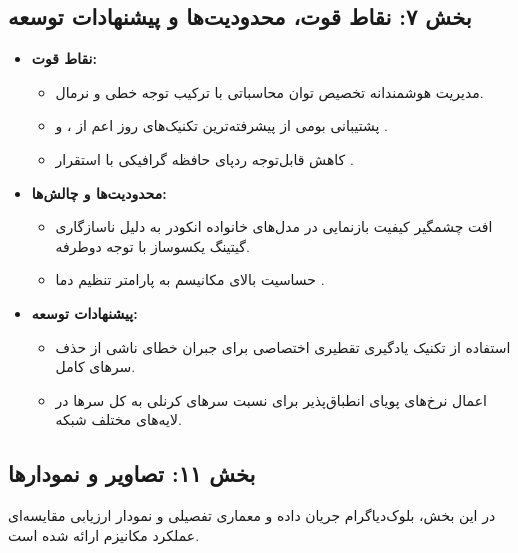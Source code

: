 \subsection*{بخش ۷: نقاط قوت، محدودیت‌ها و پیشنهادات توسعه }
\begin{itemize}
    \item \textbf{نقاط قوت:}
    \begin{itemize}
        \item مدیریت هوشمندانه تخصیص توان محاسباتی با ترکیب توجه خطی و نرمال.
        \item پشتیبانی بومی از پیشرفته‌ترین تکنیک‌های روز اعم از ،  و .
        \item کاهش قابل‌توجه ردپای حافظه گرافیکی با استقرار .
    \end{itemize}
    \item \textbf{محدودیت‌ها و چالش‌ها:}
    \begin{itemize}
        \item افت چشمگیر کیفیت بازنمایی در مدل‌های خانواده انکودر  به دلیل ناسازگاری گیتینگ یکسوساز با توجه دوطرفه.
        \item حساسیت بالای مکانیسم  به پارامتر تنظیم دما .
    \end{itemize}
    \item \textbf{پیشنهادات توسعه:}
    \begin{itemize}
        \item استفاده از تکنیک یادگیری تقطیری  اختصاصی برای جبران خطای ناشی از حذف سرهای کامل.
        \item اعمال نرخ‌های پویای انطباق‌پذیر برای نسبت سرهای کرنلی به کل سرها در لایه‌های مختلف شبکه.
    \end{itemize}
\end{itemize}

\vspace*{0.5cm}

\subsection*{بخش ۱۱: تصاویر و نمودارها }
در این بخش، بلوک‌دیاگرام جریان داده و معماری تفصیلی و نمودار ارزیابی مقایسه‌ای عملکرد مکانیزم  ارائه شده است.


